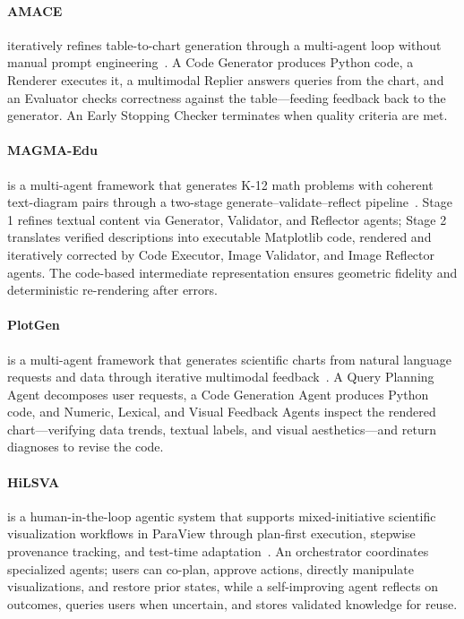 \paragraph{AMACE}
 iteratively refines table-to-chart generation through a multi-agent loop without manual prompt engineering~\cite{namgoong2025amace}. A Code Generator produces Python code, a Renderer executes it, a multimodal Replier answers queries from the chart, and an Evaluator checks correctness against the table—feeding feedback back to the generator. An Early Stopping Checker terminates when quality criteria are met.



\paragraph{MAGMA-Edu}
 is a multi-agent framework that generates K-12 math problems with coherent text-diagram pairs through a two-stage generate–validate–reflect pipeline~\cite{avg251118714}. Stage 1 refines textual content via Generator, Validator, and Reflector agents; Stage 2 translates verified descriptions into executable Matplotlib code, rendered and iteratively corrected by Code Executor, Image Validator, and Image Reflector agents. The code-based intermediate representation ensures geometric fidelity and deterministic re-rendering after errors. 


\paragraph{PlotGen}
 is a multi-agent framework that generates scientific charts from natural language requests and data through iterative multimodal feedback~\cite{goswami2025plotgen}. A Query Planning Agent decomposes user requests, a Code Generation Agent produces Python code, and Numeric, Lexical, and Visual Feedback Agents inspect the rendered chart—verifying data trends, textual labels, and visual aesthetics—and return diagnoses to revise the code. 

\paragraph{HiLSVA}
 is a human-in-the-loop agentic system that supports mixed-initiative scientific visualization workflows in ParaView through plan-first execution, stepwise provenance tracking, and test-time adaptation~\cite{avg260626614}. An orchestrator coordinates specialized agents; users can co-plan, approve actions, directly manipulate visualizations, and restore prior states, while a self-improving agent reflects on outcomes, queries users when uncertain, and stores validated knowledge for reuse.

